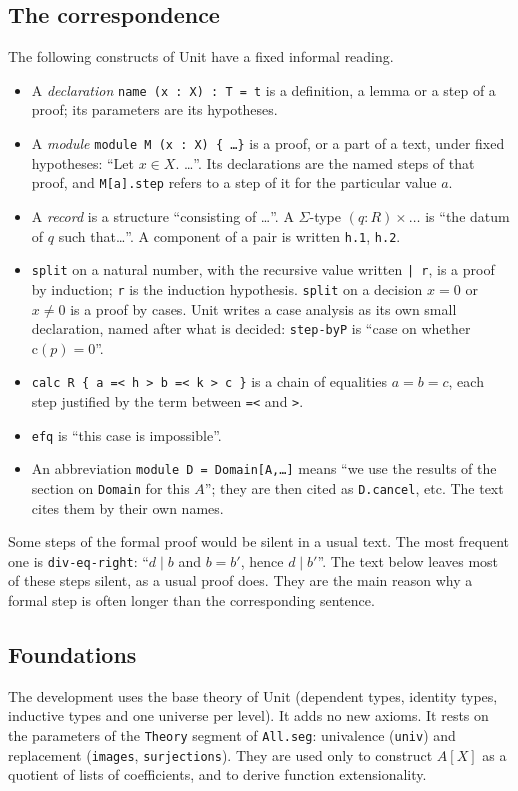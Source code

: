 \documentclass[11pt]{amsart}
\theoremstyle{definition}
\theoremstyle{remark}
\newcommand{\nm}[1]{\textup{\texttt{#1}}}
\newcommand{\file}[1]{\textup{\texttt{#1.seg}}}
\newcommand{\cont}{\mathrm{c}}
\begin{document}
\subsection*{The correspondence}
The following constructs of Unit have a fixed informal reading.
\begin{itemize}
\item A \emph{declaration} \nm{name (x : X) : T = t} is a definition, a
  lemma or a step of a proof; its parameters are its hypotheses.
\item A \emph{module} \nm{module M (x : X) \{ \dots \}} is a proof, or a
  part of a text, under fixed hypotheses: ``Let $x\in X$. \dots''. Its
  declarations are the named steps of that proof, and \nm{M[a].step} refers
  to a step of it for the particular value $a$.
\item A \emph{record} is a structure ``consisting of \dots''. A
  $\Sigma$-type $(q : R) \times \dots$ is ``the datum of $q$ such
  that\dots''. A component of a pair is written \nm{h.1}, \nm{h.2}.
\item \nm{split} on a natural number, with the recursive value written
  \nm{| r}, is a proof by induction; \nm{r} is the induction hypothesis.
  \nm{split} on a decision $x = 0$ or $x \neq 0$ is a proof by cases.
  Unit writes a case analysis as its own small declaration, named after
  what is decided: \nm{step-byP} is ``case on whether $\cont(p)=0$''.
\item \nm{calc R \{ a =< h > b =< k > c \}} is a chain of equalities
  $a = b = c$, each step justified by the term between \nm{=<} and \nm{>}.
\item \nm{efq} is ``this case is impossible''.
\item An abbreviation \nm{module D = Domain[A,\dots]} means ``we use the
  results of the section on \nm{Domain} for this $A$''; they are then
  cited as \nm{D.cancel}, etc. The text cites them by their own names.
\end{itemize}
Some steps of the formal proof would be silent in a usual text. The
most frequent one is \nm{div-eq-right}: ``$d \mid b$ and $b = b'$, hence
$d \mid b'$''. The text below leaves most of these steps silent, as a
usual proof does. They are the main reason why a formal step is often
longer than the corresponding sentence.

\subsection*{Foundations}
The development uses the base theory of Unit (dependent types, identity
types, inductive types and one universe per level). It adds no new
axioms. It rests on the parameters of the \nm{Theory} segment of
\file{All}: univalence (\nm{univ}) and replacement (\nm{images},
\nm{surjections}). They are used only to construct $A[X]$ as a quotient
of lists of coefficients, and to derive function extensionality.
\end{document}
